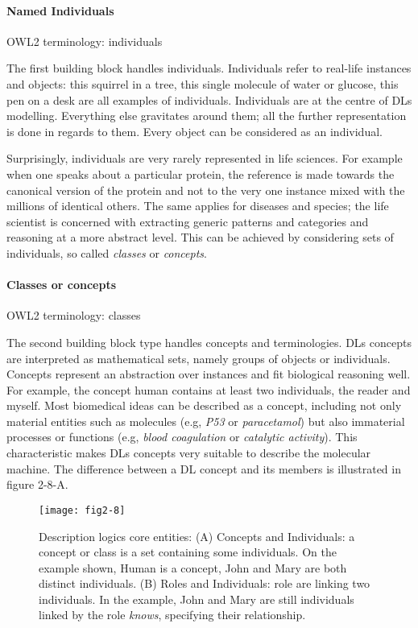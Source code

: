 \paragraph{\textbf{Named Individuals}\\}

OWL2 terminology: individuals

The first building block handles individuals. Individuals refer to real-life instances and objects: this squirrel in a tree, this single molecule of water or glucose, this pen on a desk are all examples of individuals. Individuals are at the centre of DLs modelling. Everything else gravitates around them; all the further representation is done in regards to them. Every object can be considered as an individual.

Surprisingly, individuals are very rarely represented in life sciences. For example when one speaks about a particular protein, the reference is made towards the canonical version of the protein and not to the very one instance mixed with the millions of identical others. The same applies for diseases and species; the life scientist is concerned with extracting generic patterns and categories and reasoning at a more abstract level. This can be achieved by considering sets of individuals, so called \emph{classes} or \emph{concepts}.

\paragraph{\textbf{Classes or concepts}\\}

OWL2 terminology: classes

The second building block type handles concepts and terminologies. DLs concepts are interpreted as mathematical sets, namely groups of objects or individuals. Concepts represent an abstraction over instances and fit biological reasoning well. For example, the concept human contains at least two individuals, the reader and myself. Most biomedical ideas can be described as a concept, including not only material entities such as molecules (e.g, \emph{P53} or \emph{paracetamol}) but also immaterial processes or functions (e.g, \emph{blood coagulation} or \emph{catalytic activity}). This characteristic makes DLs concepts very suitable to describe the molecular machine. The difference between a DL concept and its members is illustrated in figure 2-8-A.

\begin{figure}[ht]
    \centering
    \texttt{[image: fig2-8]}
    \caption{Description logics core entities: (A) Concepts and Individuals: a concept or class is a set containing some individuals. On the example shown, Human is a concept, John and Mary are both distinct individuals. (B) Roles and Individuals: role are linking two individuals. In the example, John and Mary are still individuals linked by the role \emph{knows}, specifying their relationship.}
    \label{fig2-8}
\end{figure}

